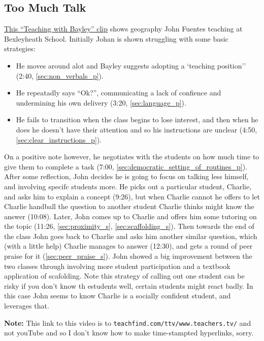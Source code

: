 \documentclass[12pt]{report}
\begin{document}
\begin{appendices}
\section{Too Much Talk}
\label{video:2}

\href{http://archive.teachfind.com/ttv/www.teachers.tv/videos/too-much-talk.html}{This ``Teaching with Bayley'' clip} shows geography John Fuentes teaching at Bexleyheath School. Initially Johan is shown struggling with some basic strategies: 
\begin{itemize}
  \item He moves around alot and Bayley suggests adopting a `teaching position'' (2:40, \ref{sec:non_verbals_p}).
  \item He repeatadly says ``Ok?'', communicating a lack of confience and undermining his own delivery (3:20, \ref{sec:language_p}).
  \item He fails to transition when the class begins to lose interest, and then when he does he doesn't have their attention and so his instructions are unclear (4:50, \ref{sec:clear_instructions_p}).
\end{itemize}
On a positive note however, he negotiates with the students on how much time to give them to complete a task (7:00, \ref{sec:democratic_setting_of_routines_p}). After some reflection, John decides he is going to focus on talking less himself, and involving specifc students more. He picks out a particular student, Charlie, and asks him to explain a concept (9:26), but when Charlie cannot he offers to let Charlie handball the question to another student Charlie thinks might know the answer (10:08). Later, John comes up to Charlie and offers him some tutoring on the topic (11:26, \ref{sec:proximity_s}, \ref{sec:scaffolding_s}). Then towards the end of the class John goes back to Charlie and asks him another similar question, which (with a little help) Charlie manages to answer (12:30), and gets a round of peer praise for it (\ref{sec:peer_praise_s}). John showed a big improvement between the two classes through involving more student participation and a textbook application of scafolding. Note this strategy of calling out one student can be risky if you don't know th estudents well, certain students might react badly. In this case John seems to know Charlie is a socially confident student, and leverages that.

\textbf{Note:} This link to this video is to \texttt{teachfind.com/ttv/www.teachers.tv/} and not youTube and so I don't know how to make time-stampted hyperlinks, sorry.




\end{appendices}
\end{document}
